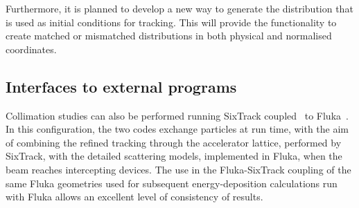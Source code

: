 \documentclass[a4paper,
              ]{jacow}
\begin{document}
Furthermore, it is planned to develop a new way to generate the distribution that is used as initial conditions for tracking. This will provide the functionality to create matched or mismatched distributions in both physical and normalised coordinates.

\subsection{Interfaces to external programs}

Collimation studies can also be performed running SixTrack coupled~\cite{flukaCouplingVV} to Fluka~\cite{FLUKA1,FLUKA2}. In this configuration, the two codes exchange particles at run time, with the aim of combining the refined tracking through the accelerator lattice, performed by SixTrack, with the detailed scattering models, implemented in Fluka, when the beam reaches intercepting devices. The use in the Fluka-SixTrack coupling of the same Fluka geometries used for subsequent energy-deposition calculations run with Fluka allows an excellent level of consistency of results.
\end{document}
